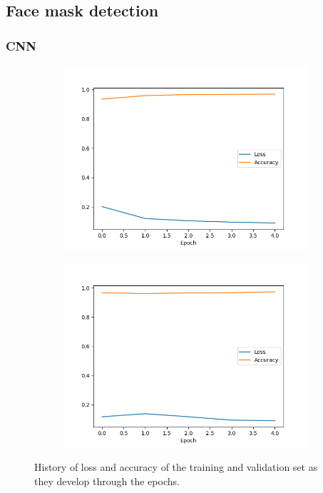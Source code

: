 \documentclass[../main.tex]{subfiles}
\begin{document}
\subsection{Face mask detection}
\subsubsection{CNN}

\begin{figure}[H]
    \begin{subfigure}{.5\textwidth}
        \centering
        \includegraphics[width=1.1\linewidth]{assets/facemasks_train_history.png}
    \end{subfigure}
    \begin{subfigure}{.5\textwidth}
        \centering
        \includegraphics[width=1.1\linewidth]{assets/facemasks_val_history.png}
    \end{subfigure}
    \caption{History of loss and accuracy of the training and validation set as they develop through the epochs.}
    \label{fig:facemasks_cnn_history}
\end{figure}
\end{document}
